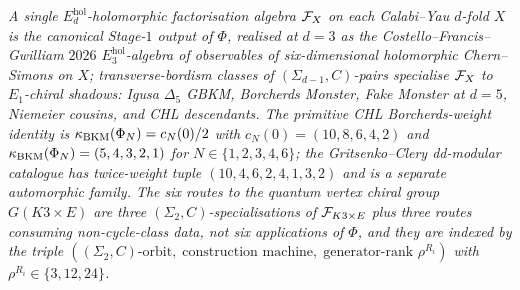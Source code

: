 \emph{A single $E_d^{\mathrm{hol}}$-holomorphic factorisation algebra
$\mathcal{F}_X$ on each Calabi--Yau $d$-fold $X$ is the canonical Stage-$1$
output of $\Phi$, realised at $d = 3$ as the
Costello--Francis--Gwilliam $2026$ $E_3^{\mathrm{hol}}$-algebra of
observables of six-dimensional holomorphic Chern--Simons on $X$;
transverse-bordism classes of $(\Sigma_{d-1}, C)$-pairs specialise
$\mathcal{F}_X$ to $E_1$-chiral shadows: Igusa $\Delta_5$ GBKM, Borcherds
Monster, Fake Monster at $d = 5$, Niemeier cousins, and CHL
descendants.  The primitive CHL Borcherds-weight identity is
$\kappa_{\mathrm{BKM}}(\Phi_N) = c_N(0)/2$ with
$c_N(0)=(10,8,6,4,2)$ and
$\kappa_{\mathrm{BKM}}(\Phi_N)=(5,4,3,2,1)$ for $N\in\{1,2,3,4,6\}$; the
Gritsenko--Clery dd-modular catalogue has twice-weight tuple
$(10,4,6,2,4,1,3,2)$ and is a separate automorphic family.  The six
routes to the quantum vertex chiral group
$G(K3\times E)$ are three $(\Sigma_2, C)$-specialisations of
$\mathcal{F}_{K3\times E}$ plus three routes consuming non-cycle-class data,
not six applications of $\Phi$, and they are indexed by the triple
$(\text{$(\Sigma_2, C)$-orbit},\; \text{construction machine},\;
\text{generator-rank } \rho^{R_i})$ with $\rho^{R_i} \in \{3, 12, 24\}$.}
